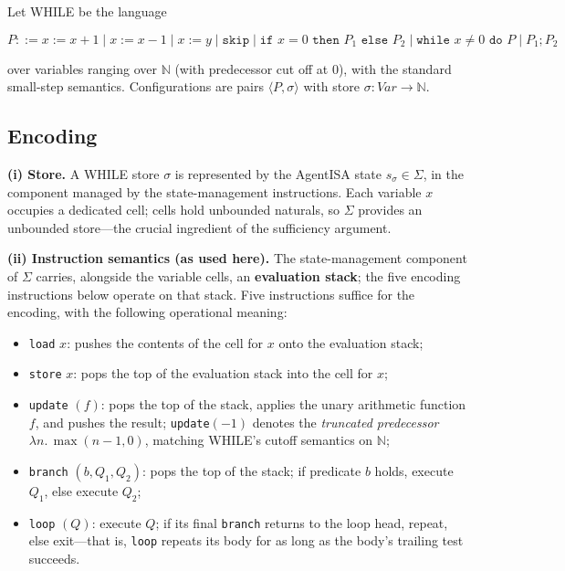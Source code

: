 \documentclass[
  11pt,
]{article}
\providecommand{\tightlist}{%
  \setlength{\itemsep}{0pt}\setlength{\parskip}{0pt}}
\begin{document}
Let WHILE be the language

\[
P ::= x := x+1 \mid x := x-1 \mid x := y \mid \texttt{skip} \mid \texttt{if } x = 0 \texttt{ then } P_1 \texttt{ else } P_2 \mid \texttt{while } x \neq 0 \texttt{ do } P \mid P_1 ; P_2
\]

over variables ranging over \(\mathbb{N}\) (with predecessor cut off at
0), with the standard small-step semantics. Configurations are pairs
\(\langle P, \sigma \rangle\) with store
\(\sigma : Var \to \mathbb{N}\).

\subsection{Encoding}\label{encoding}

\textbf{(i) Store.} A WHILE store \(\sigma\) is represented by the
AgentISA state \(s_\sigma \in \Sigma\), in the component managed by the
state-management instructions. Each variable \(x\) occupies a dedicated
cell; cells hold unbounded naturals, so \(\Sigma\) provides an unbounded
store---the crucial ingredient of the sufficiency argument.

\textbf{(ii) Instruction semantics (as used here).} The state-management
component of \(\Sigma\) carries, alongside the variable cells, an
\textbf{evaluation stack}; the five encoding instructions below operate
on that stack. Five instructions suffice for the encoding, with the
following operational meaning:

\begin{itemize}
\tightlist
\item
  \texttt{load} \(x\): pushes the contents of the cell for \(x\) onto
  the evaluation stack;
\item
  \texttt{store} \(x\): pops the top of the evaluation stack into the
  cell for \(x\);
\item
  \texttt{update} \((f)\): pops the top of the stack, applies the unary
  arithmetic function \(f\), and pushes the result;
  \texttt{update}\((-1)\) denotes the \emph{truncated predecessor}
  \(\lambda n.\,\max(n-1, 0)\), matching WHILE's cutoff semantics on
  \(\mathbb{N}\);
\item
  \texttt{branch} \((b, Q_1, Q_2)\): pops the top of the stack; if
  predicate \(b\) holds, execute \(Q_1\), else execute \(Q_2\);
\item
  \texttt{loop} \((Q)\): execute \(Q\); if its final \texttt{branch}
  returns to the loop head, repeat, else exit---that is, \texttt{loop}
  repeats its body for as long as the body's trailing test succeeds.
\end{itemize}
\end{document}
